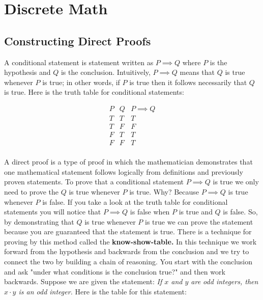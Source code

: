 \documentclass{amsbook}
\begin{document}
\chapter{Discrete Math}

\section{Constructing Direct Proofs}

A conditional statement is statement written as $P\implies Q$ where $P$ is the hypothesis and $ Q $ is the conclusion. Intuitively, $P \implies Q$ means that $Q$ is true whenever $P$ is true; in other words, if $P$ is true then it follows necessarily that $Q$ is true. Here is the truth table for conditional statements:

\begin{center}
    \[
\begin{array}{r|c|l} 
P & Q & P \implies Q\\
\hline
T & T & T\\
T & F & F\\
F & T & T\\
F & F & T\\
\end{array}
\]
\end{center}

A direct proof is a type of proof in which the mathematician demonstrates that one mathematical statement follows logically from definitions and previously proven statements. To prove that a conditional statement $P \implies Q$ is true we only need to prove the $Q$ is true whenever $P$ is true. Why? Because $P\implies Q$ is true whenever $P$ is false. If you take a look at the truth table for conditional statements you will notice that $P \implies Q$ is false when $P$ is true and $Q$ is false. So, by demonstrating that $Q$ is true whenever $P$ is true we can prove the statement because you are guaranteed that the statement is true. There is a technique for proving by this method called the \textbf{know-show-table.} In this technique we work forward from the hypothesis and backwards from the conclusion and we try to connect the two by building a chain of reasoning. You start with the conclusion and ask "under what conditions is the conclusion true?" and then work backwards. Suppose  we are given the statement: \textit{If $x$ and $y$ are odd integers, then $x \cdot y$ is an odd integer.} Here is the table for this statement:
\end{document}

